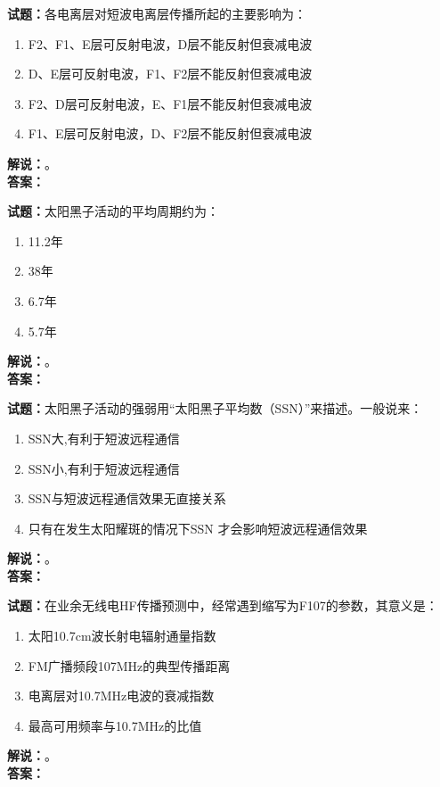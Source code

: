 \documentclass{ctexbook}
\begin{document}
\bigskip




\noindent\textbf{试题：}各电离层对短波电离层传播所起的主要影响为：
\begin{enumerate}[leftmargin=3em]
\item F2、F1、E层可反射电波，D层不能反射但衰减电波
\item D、E层可反射电波，F1、F2层不能反射但衰减电波
\item F2、D层可反射电波，E、F1层不能反射但衰减电波
\item F1、E层可反射电波，D、F2层不能反射但衰减电波
\end{enumerate}
\noindent\textbf{解说：}\textbf{}。\\\noindent\textbf{答案：}

\bigskip




\noindent\textbf{试题：}太阳黑子活动的平均周期约为：
\begin{enumerate}[leftmargin=3em]
\item 11.2年
\item 38年
\item 6.7年
\item 5.7年
\end{enumerate}
\noindent\textbf{解说：}\textbf{}。\\\noindent\textbf{答案：}

\bigskip




\noindent\textbf{试题：}太阳黑子活动的强弱用“太阳黑子平均数（SSN）”来描述。一般说来：
\begin{enumerate}[leftmargin=3em]
\item SSN大,有利于短波远程通信
\item SSN小,有利于短波远程通信
\item SSN与短波远程通信效果无直接关系
\item 只有在发生太阳耀斑的情况下SSN 才会影响短波远程通信效果
\end{enumerate}
\noindent\textbf{解说：}\textbf{}。\\\noindent\textbf{答案：}

\bigskip




\noindent\textbf{试题：}在业余无线电HF传播预测中，经常遇到缩写为F107的参数，其意义是：
\begin{enumerate}[leftmargin=3em]
\item 太阳10.7cm波长射电辐射通量指数
\item FM广播频段107\unit{\MHz}的典型传播距离
\item 电离层对10.7\unit{\MHz}电波的衰减指数
\item 最高可用频率与10.7\unit{\MHz}的比值
\end{enumerate}
\noindent\textbf{解说：}\textbf{}。\\\noindent\textbf{答案：}
\end{document}
